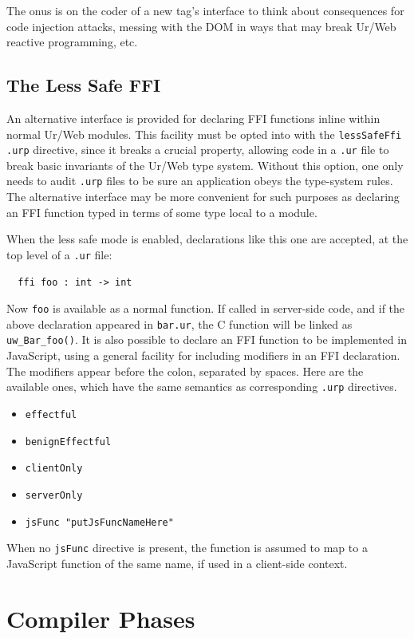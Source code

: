 \documentclass{article}
\begin{document}
The onus is on the coder of a new tag's interface to think about consequences for code injection attacks, messing with the DOM in ways that may break Ur/Web reactive programming, etc.

\subsection{The Less Safe FFI}

An alternative interface is provided for declaring FFI functions inline within normal Ur/Web modules.  This facility must be opted into with the \texttt{lessSafeFfi} \texttt{.urp} directive, since it breaks a crucial property, allowing code in a \texttt{.ur} file to break basic invariants of the Ur/Web type system.  Without this option, one only needs to audit \texttt{.urp} files to be sure an application obeys the type-system rules.  The alternative interface may be more convenient for such purposes as declaring an FFI function typed in terms of some type local to a module.

When the less safe mode is enabled, declarations like this one are accepted, at the top level of a \texttt{.ur} file:
\begin{verbatim}
  ffi foo : int -> int
\end{verbatim}

Now \texttt{foo} is available as a normal function.  If called in server-side code, and if the above declaration appeared in \texttt{bar.ur}, the C function will be linked as \texttt{uw\_Bar\_foo()}.  It is also possible to declare an FFI function to be implemented in JavaScript, using a general facility for including modifiers in an FFI declaration.  The modifiers appear before the colon, separated by spaces.  Here are the available ones, which have the same semantics as corresponding \texttt{.urp} directives.
\begin{itemize}
\item \texttt{effectful}
\item \texttt{benignEffectful}
\item \texttt{clientOnly}
\item \texttt{serverOnly}
\item \texttt{jsFunc "putJsFuncNameHere"}
\end{itemize}

When no \texttt{jsFunc} directive is present, the function is assumed to map to a JavaScript function of the same name, if used in a client-side context.


\section{\label{phases}Compiler Phases}
\end{document}
